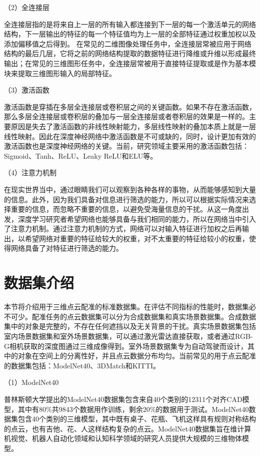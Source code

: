 （2）全连接层\par
全连接层指的是将来自上一层的所有输入都连接到下一层的每一个激活单元的网络结构，下一层输出的特征的每一个特征值均为上一层的全部特征通过权重加权以及添加偏移值之后得到。
在常见的二维图像处理任务中，全连接层常被应用于网络结构的最后几层，它将之前的网络结构提取的数据特征进行降维或升维以形成最终输出；在常见的三维图形任务中，全连接层常被用于直接特征提取或是作为基本模块来提取三维图形输入的局部特征。

（3）激活函数\par
激活函数是穿插在多层全连接层或卷积层之间的关键函数。如果不存在激活函数，那么多层全连接层或卷积层的叠加与一层全连接层或者卷积层的效果是一样的。主要原因是失去了激活函数的非线性映射能力，多层线性映射的叠加本质上就是一层线性映射。因此在深度神经网络中激活函数是不可或缺的，同时，设计更加有效的激活函数也是深度神经网络的关键。当前，研究领域主要采用的激活函数包括：Sigmoid、Tanh、ReLU、Leaky ReLU和ELU等。

（4）注意力机制\par
在现实世界当中，通过眼睛我们可以观察到各种各样的事物，从而能够感知到大量的信息。此外，因为我们具备对信息进行筛选的能力，所以可以根据实际情况来选择重要的信息，而忽略不重要的信息，以避免受海量信息的干扰。从这一角度出发，深度学习研究者希望网络也能够具备与我们相同的能力，所以在网络当中引入了注意力机制。通过注意力机制的方式，网络可以对输入特征进行加权之后再输出，以希望网络对重要的特征给较大的权重，对不太重要的特征给较小的权重，使得网络具备了对特征进行筛选的能力。

\section{数据集介绍}
本节将介绍用于三维点云配准的标准数据集。在评估不同指标的性能时，数据集必不可少。配准任务的点云数据集可以分为合成数据集和真实场景数据集。合成数据集中的对象是完整的，不存在任何遮挡以及无关背景的干扰。真实场景数据集包括室内场景数据集和室外场景数据集，可以通过激光雷达直接获取，或者通过RGB-G相机获取的深度图通过三维成像得到。室外场景数据集专为自动驾驶而设计，其中的对象在空间上的分离性好，并且点云数据分布均匀。当前常见的用于点云配准的数据集包括：ModelNet40、3DMatch和KITTI。\par

（1）ModelNet40\par
普林斯顿大学提出的ModelNet40数据集包含来自40个类别的12311个对齐CAD模型，其中有80\%共9843个数据用作训练，剩余20\%的数据用于测试。ModelNet40数据集包含40个类别的三维模型，其中既有桌子、花瓶、飞机这样具有规则对称结构的点云，也有吉他、花、人这样结构复杂的点云。ModelNet40数据集旨在维计算机视觉、机器人自动化领域和认知科学领域的研究人员提供大规模的三维物体模型。

